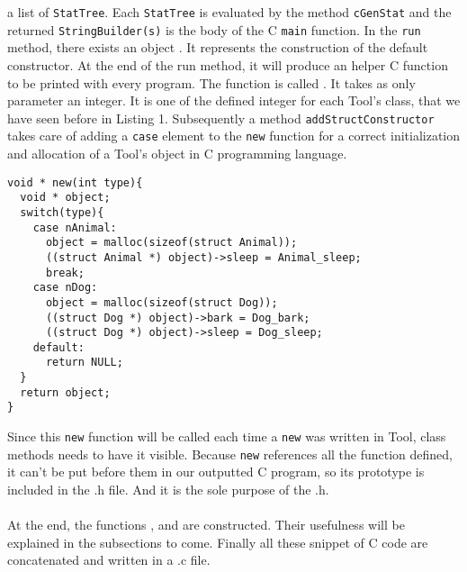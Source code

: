 a list of {\lstinline[basicstyle=\small\ttfamily]|StatTree|}.
Each {\lstinline[basicstyle=\small\ttfamily]|StatTree|} is evaluated
by the method {\lstinline[basicstyle=\small\ttfamily]|cGenStat|} and
the returned {\lstinline[basicstyle=\small\ttfamily]|StringBuilder(s)|}
is the body of the C {\lstinline[basicstyle=\small\ttfamily]|main|} function.
\newline
In the {\lstinline[basicstyle=\small\ttfamily]|run|} method, there exists
an object
\newline
\lstset{style=customc}{\lstinline[basicstyle=\small\ttfamily]|defaultConstructor|}.
It represents the construction of the default constructor. At the end of the run method, it will produce an helper C function to be printed with every program. The function is called
\lstset{style=customc}{\lstinline[basicstyle=\small\ttfamily]|new|}.
It takes as only parameter an integer. It is one of the defined integer for each Tool's class,
that we have seen before in Listing 1. %
Subsequently a method {\lstinline[basicstyle=\small\ttfamily]|addStructConstructor|}
takes care of adding a {\lstinline[basicstyle=\small\ttfamily]|case|} element
to the {\lstinline[basicstyle=\small\ttfamily]|new|} function for a correct
initialization and allocation of a Tool's object in C programming language.
\begin{lstlisting}[caption={In the case of the example used in the section 2}, captionpos=b]
void * new(int type){
  void * object;
  switch(type){
    case nAnimal:
      object = malloc(sizeof(struct Animal));
      ((struct Animal *) object)->sleep = Animal_sleep;
      break;
    case nDog:
      object = malloc(sizeof(struct Dog));
      ((struct Dog *) object)->bark = Dog_bark;
      ((struct Dog *) object)->sleep = Dog_sleep;
    default:
      return NULL;
  }
  return object;
}
\end{lstlisting}
Since this {\lstinline[basicstyle=\small\ttfamily]|new|} function will be called each time a {\lstinline[basicstyle=\small\ttfamily]|new|} was written in Tool, class methods needs to have it visible. Because {\lstinline[basicstyle=\small\ttfamily]|new|} references all the function defined, it can't be put before them in our outputted C program, so its prototype is included in the .h file. And it is the sole purpose of the .h.\\\\
At the end, the functions
\newline
\lstset{style=customc}{\lstinline[basicstyle=\small\ttfamily]|void helper_reverse_plus(char str[], int len)|},
\lstset{style=customc}{\lstinline[basicstyle=\small\ttfamily]|char* itoa(int num)|} and
\lstset{style=customc}{\lstinline[basicstyle=\small\ttfamily]|int * arrayAlloc(int size)|} are constructed.
Their usefulness will be explained in the subsections to come.
\newline
Finally all these snippet of C code are concatenated and written in a .c file.
\newline
